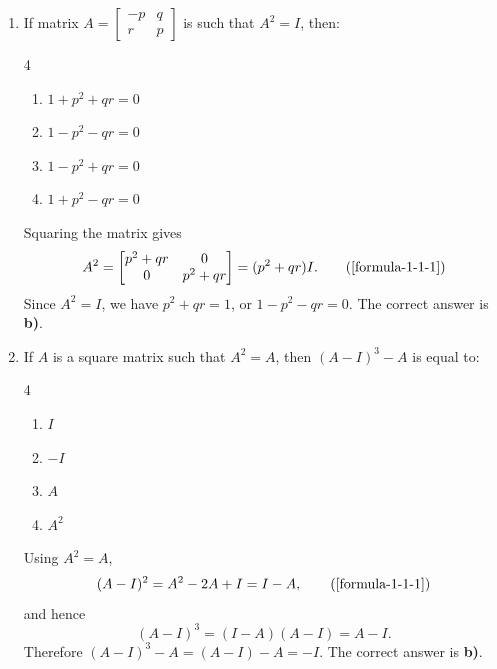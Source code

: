 \begin{enumerate}[label={},leftmargin=1.15cm,labelwidth=1.0cm,labelsep=0.15cm,itemindent=0pt,listparindent=0pt,itemsep=\baselineskip,parsep=0pt,topsep=0pt]
\item[5.1.1] If matrix $A=\begin{bmatrix}-p&q\\r&p\end{bmatrix}$ is such that $A^2=I$, then:

\begin{multicols}{4}
\begin{enumerate}
\setlength{\itemsep}{0pt}
    \item $1+p^2+qr=0$
    \item $1-p^2-qr=0$
    \item $1-p^2+qr=0$
    \item $1+p^2-qr=0$
\end{enumerate}
\end{multicols}

\vspace{0.6em}\par\solution


Squaring the matrix gives
\begin{equation*}
A^2=\begin{bmatrix}p^2+qr&0\\0&p^2+qr\end{bmatrix}=(p^2+qr)I.
\tag*{(\ref{formula-1-1-1})}\end{equation*}
Since $A^2=I$, we have $p^2+qr=1$, or $1-p^2-qr=0$. The correct answer is \textbf{b)}.

\item[5.1.2] If $A$ is a square matrix such that $A^2=A$, then $(A-I)^3-A$ is equal to:

\begin{multicols}{4}
\begin{enumerate}
\setlength{\itemsep}{0pt}
    \item $I$
    \item $-I$
    \item $A$
    \item $A^2$
\end{enumerate}
\end{multicols}

\vspace{0.6em}\par\solution


Using $A^2=A$,
\begin{equation*}
(A-I)^2=A^2-2A+I=I-A,
\tag*{(\ref{formula-1-1-1})}\end{equation*}
and hence
\[
(A-I)^3=(I-A)(A-I)=A-I.
\]
Therefore $(A-I)^3-A=(A-I)-A=-I$. The correct answer is \textbf{b)}.


\end{enumerate}
